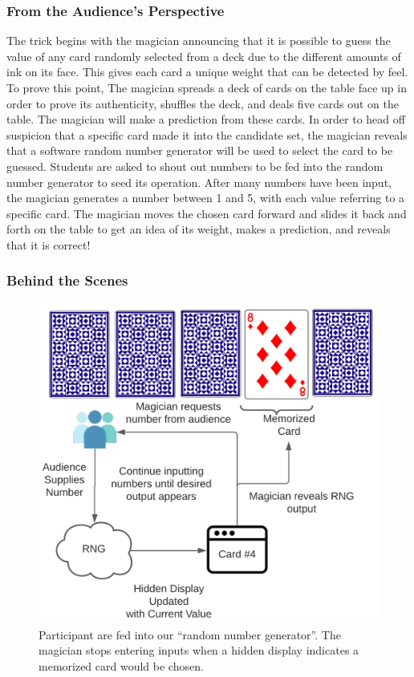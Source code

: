 \subsubsection{From the Audience's Perspective}

The trick begins with the magician announcing that it is possible to
guess the value of any card randomly selected from a deck due to the different amounts of ink on its face.
This gives each card
a unique
weight that can be detected by feel.
To prove this point,
The magician spreads a deck of cards on the table face up
in order to prove its authenticity,
shuffles the deck,
and deals five cards out on the table.
The magician will make a prediction from these cards.
In order to head off suspicion that a specific card made it into the candidate set, the magician reveals that
a software random number generator will be used to select the card to be
guessed.
Students are asked to shout out numbers to be fed into the random number
generator to seed its operation.  After many numbers have been input, the
magician generates a number between 1 and 5, with each value referring to a
specific card.  The magician moves the chosen card forward and slides it back
and forth on the table to get an idea of its weight,  makes
a prediction, and reveals that it is correct!

\subsubsection{Behind the Scenes}

\begin{figure}[H]
\centering
\includegraphics[scale=.6]{images/Trick3}
\caption{Participant are fed into our ``random number generator''.  The magician stops entering inputs
when a hidden display indicates a memorized card would be chosen.}
\label{fig:trick3}
\end{figure}

